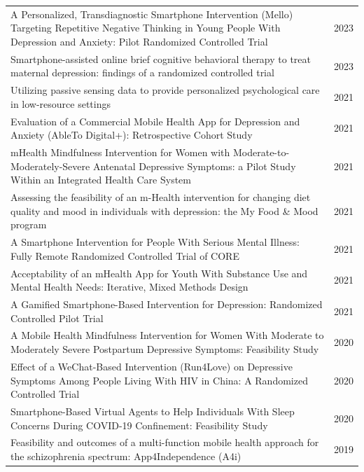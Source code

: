 \begin{longtable}{@{}p{} r@{}}
A Personalized, Transdiagnostic Smartphone Intervention (Mello) Targeting Repetitive Negative Thinking in Young People With Depression and Anxiety: Pilot Randomized Controlled Trial~\cite{bell2023mello} & 2023 \\
Smartphone-assisted online brief cognitive behavioral therapy to treat maternal depression: findings of a randomized controlled trial~\cite{fatori2023maternaldepression} & 2023 \\
Utilizing passive sensing data to provide personalized psychological care in low-resource settings~\cite{byanjankar2021passivesensing} & 2021 \\
Evaluation of a Commercial Mobile Health App for Depression and Anxiety (AbleTo Digital+): Retrospective Cohort Study~\cite{anton2021ableto} & 2021 \\
mHealth Mindfulness Intervention for Women with Moderate-to-Moderately-Severe Antenatal Depressive Symptoms: a Pilot Study Within an Integrated Health Care System~\cite{kubo2021mhealthmindfulness} & 2021 \\
Assessing the feasibility of an m-Health intervention for changing diet quality and mood in individuals with depression: the My Food \& Mood program~\cite{young2021myfoodmood} & 2021 \\
A Smartphone Intervention for People With Serious Mental Illness: Fully Remote Randomized Controlled Trial of CORE~\cite{ben-zeev2021core} & 2021 \\
Acceptability of an mHealth App for Youth With Substance Use and Mental Health Needs: Iterative, Mixed Methods Design~\cite{adams2021mhealthapp} & 2021 \\
A Gamified Smartphone-Based Intervention for Depression: Randomized Controlled Pilot Trial~\cite{lukas2021mentalis} & 2021 \\
A Mobile Health Mindfulness Intervention for Women With Moderate to Moderately Severe Postpartum Depressive Symptoms: Feasibility Study~\cite{avalos2020mhealthmindfulness} & 2020 \\
Effect of a WeChat-Based Intervention (Run4Love) on Depressive Symptoms Among People Living With HIV in China: A Randomized Controlled Trial~\cite{guo2020run4love} & 2020 \\
Smartphone-Based Virtual Agents to Help Individuals With Sleep Concerns During COVID-19 Confinement: Feasibility Study~\cite{philip2020kanopee} & 2020 \\
Feasibility and outcomes of a multi-function mobile health approach for the schizophrenia spectrum: App4Independence (A4i)~\cite{kidd2019app4independence} & 2019 \\

\end{longtable}
